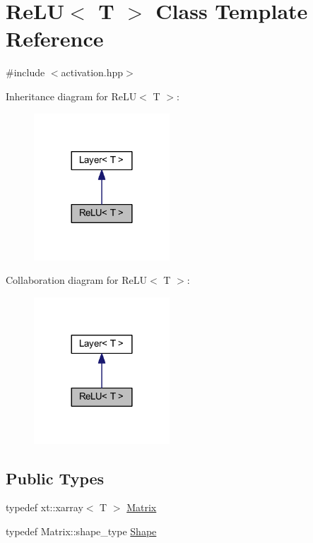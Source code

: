 \hypertarget{class_re_l_u}{}\section{Re\+LU$<$ T $>$ Class Template Reference}
\label{class_re_l_u}


{\ttfamily \#include $<$activation.\+hpp$>$}



Inheritance diagram for Re\+LU$<$ T $>$\+:
\nopagebreak
\begin{figure}[H]
\begin{center}
\leavevmode
\includegraphics[width=144pt]{class_re_l_u__inherit__graph}
\end{center}
\end{figure}


Collaboration diagram for Re\+LU$<$ T $>$\+:
\nopagebreak
\begin{figure}[H]
\begin{center}
\leavevmode
\includegraphics[width=144pt]{class_re_l_u__coll__graph}
\end{center}
\end{figure}
\subsection*{Public Types}
\begin{DoxyCompactItemize}
\item 
typedef xt\+::xarray$<$ T $>$ \mbox{\hyperlink{class_re_l_u_a3d1448f06335a4ab7227ec31a43a410f}{Matrix}}
\item 
typedef Matrix\+::shape\+\_\+type \mbox{\hyperlink{class_re_l_u_ae27e6aba0a09baa85b8ef8679db42719}{Shape}}
\end{DoxyCompactItemize}
